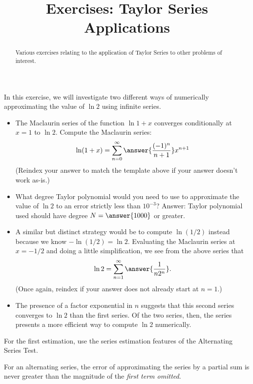 \documentclass{ximera}
\title{Exercises: Taylor Series Applications}
\begin{document}
\begin{abstract}
Various exercises relating to the application of Taylor Series to other problems of interest.
\end{abstract}
\maketitle



\begin{exercise}
In this exercise, we will investigate two different ways of numerically approximating the value of $\ln 2$ using infinite series.

\begin{itemize}
\item The Maclaurin series of the function $\ln 1 + x$ converges conditionally at $x = 1$ to $\ln 2$. Compute the Maclaurin series: 
\[ \ln (1 + x) = \sum_{n=0}^\infty \answer{\frac{(-1)^n}{n+1}} x^{n+1} \]
(Reindex your answer to match the template above if your answer doesn't work as-is.)
\item  What degree Taylor polynomial would you need to use to approximate the value of $\ln 2$ to an error strictly less than $10^{-3}$? Answer: Taylor polynomial used should have degree $N = \answer{1000}$ or greater.
\item A similar but distinct strategy would be to compute $\ln (1/2)$ instead because we know $- \ln (1/2)  = \ln 2$. Evaluating the Maclaurin series at $x=-1/2$ and doing a little simplification, we see from the above series that
\[ \ln 2 = \sum_{n=1}^\infty \answer{\frac{1}{n 2^n}}. \]
(Once again, reindex if your answer does not already start at $n=1$.)
\item The presence of a factor exponential in $n$ suggests that this second series converges to $\ln 2$  than the first series. Of the two series, then, the  series presents a more efficient way to compute $\ln 2$ numerically.
\end{itemize}
\begin{hint}
For the first estimation, use the series estimation features of the Alternating Series Test.
\begin{hint}
For an alternating series, the error of approximating the series by a partial sum is never greater than the magnitude of the \textit{first term omitted}.
\end{hint}
\end{hint}
\end{exercise}
\end{document}
